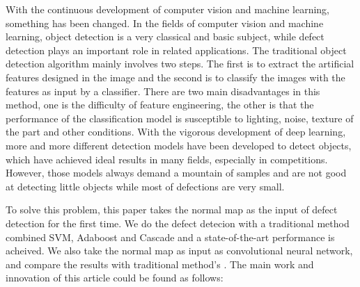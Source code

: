 \begin{englishabstract}

With the continuous development of computer vision and machine learning,
something has been changed.
In the fields of computer vision and machine learning, object detection is a very classical and basic subject, while defect detection plays an important role in related applications. 
The traditional object detection algorithm mainly involves two steps.
The first is to extract the artificial features designed in the image and the second is to classify the images with the features as input by a classifier.
There are two main disadvantages in this method, 
one is the difficulty of feature engineering, 
the other is that the performance of the classification model is susceptible to lighting, noise, texture of the part and other conditions.
With the vigorous development of deep learning, more and more different detection models have been developed to detect objects, which have achieved ideal results in many fields, especially in competitions. 
However, those models always demand a mountain of samples and
are not good at detecting little objects while most of defections are very small.

To solve this problem, this paper takes the normal map as the input of defect detection for the first time. We do the defect detecion with a traditional method combined SVM, Adaboost and Cascade and a state-of-the-art performance is acheived. We also take the normal map as input as convolutional neural network, and compare the results with traditional method's .
The main work and innovation of this article could be found as follows:


\end{englishabstract}
